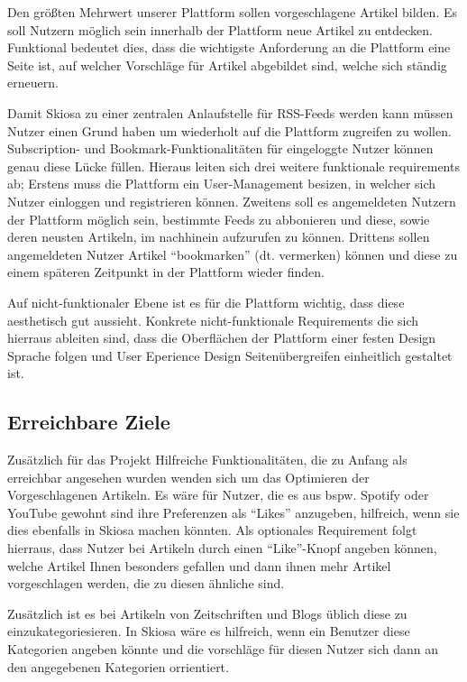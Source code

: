 Den größten Mehrwert unserer Plattform sollen vorgeschlagene Artikel bilden.
Es soll Nutzern möglich sein innerhalb der Plattform neue Artikel zu entdecken.
Funktional bedeutet dies, dass die wichtigste Anforderung an die Plattform eine Seite ist, auf welcher Vorschläge für Artikel abgebildet sind, welche sich ständig erneuern.

Damit Skiosa zu einer zentralen Anlaufstelle für RSS-Feeds werden kann müssen Nutzer einen Grund haben um wiederholt auf die Plattform zugreifen zu wollen.
Subscription- und Bookmark-Funktionalitäten für eingeloggte Nutzer können genau diese Lücke füllen.
Hieraus leiten sich drei weitere funktionale requirements ab;
Erstens muss die Plattform ein User-Management besizen, in welcher sich Nutzer einloggen und registrieren können.
Zweitens soll es angemeldeten Nutzern der Plattform möglich sein, bestimmte Feeds zu abbonieren und diese, sowie deren neusten Artikeln, im nachhinein aufzurufen zu können.
Drittens sollen angemeldeten Nutzer Artikel ``bookmarken'' (dt. vermerken) können und diese zu einem späteren Zeitpunkt in der Plattform wieder finden.

Auf nicht-funktionaler Ebene ist es für die Plattform wichtig, dass diese aesthetisch gut aussieht.
Konkrete nicht-funktionale Requirements die sich hierraus ableiten sind, dass die Oberflächen der Plattform einer festen Design Sprache folgen und User Eperience Design Seitenübergreifen einheitlich gestaltet ist.

\subsection{Erreichbare Ziele}
Zusätzlich für das Projekt Hilfreiche Funktionalitäten, die zu Anfang als erreichbar angesehen wurden wenden sich um das Optimieren der Vorgeschlagenen Artikeln.
Es wäre für Nutzer, die es aus bspw. Spotify oder YouTube gewohnt sind ihre Preferenzen als ``Likes'' anzugeben, hilfreich, wenn sie dies ebenfalls in Skiosa machen könnten.
Als optionales Requirement folgt hierraus, dass Nutzer bei Artikeln durch einen ``Like''-Knopf angeben können, welche Artikel Ihnen besonders gefallen und dann ihnen mehr Artikel vorgeschlagen werden, die zu diesen ähnliche sind.

Zusätzlich ist es bei Artikeln von Zeitschriften und Blogs üblich diese zu einzukategoriesieren.
In Skiosa wäre es hilfreich, wenn ein Benutzer diese Kategorien angeben könnte und die vorschläge für diesen Nutzer sich dann an den angegebenen Kategorien orrientiert.

